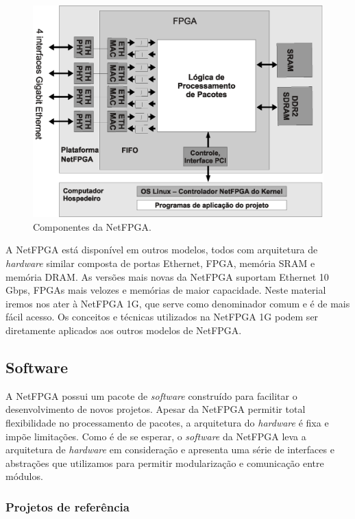 \begin{figure}
\centering
\includegraphics[scale=0.6,angle=0]{figures/placa/infraplaca.eps}
\caption{Componentes da NetFPGA.}
\label{fig:arch.hardware}
\end{figure}

A NetFPGA está disponível em outros modelos, todos com arquitetura de
\emph{hardware} similar composta de portas Ethernet, FPGA, memória SRAM
e memória DRAM.  As versões mais novas da NetFPGA suportam Ethernet
10\,Gbps, FPGAs mais velozes e memórias de maior capacidade.  Neste
material iremos nos ater à NetFPGA 1G, que serve como denominador comum
e é de mais fácil acesso.  Os conceitos e técnicas utilizados na NetFPGA
1G podem ser diretamente aplicados aos outros modelos de NetFPGA.

\subsection{Software}
\label{sec:arch.soft}

A NetFPGA possui um pacote de \emph{software} construído para facilitar
o desenvolvimento de novos projetos.  Apesar da NetFPGA permitir total
flexibilidade no processamento de pacotes, a arquitetura do
\emph{hardware} é fixa e impõe limitações.  Como é de se esperar, o
\emph{software} da NetFPGA leva a arquitetura de \emph{hardware} em
consideração e apresenta uma série de interfaces e abstrações que
utilizamos para permitir modularização e comunicação entre módulos.

\subsubsection{Projetos de referência}

